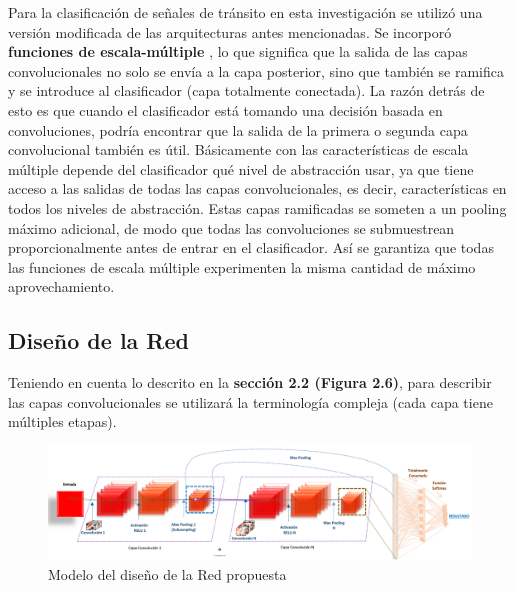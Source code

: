 	Para la clasificación de señales de tránsito en esta investigación se utilizó una versión modificada de las arquitecturas antes mencionadas. Se incorporó {\bf funciones de escala-múltiple} \citep{Multi_scale_feat}, lo que significa que la salida de las capas convolucionales no solo se envía a la capa posterior, sino que también se ramifica y se introduce al clasificador (capa totalmente conectada). La razón detrás de esto es que cuando el clasificador está tomando una decisión basada en convoluciones, podría encontrar que la salida de la primera o segunda capa convolucional también es útil. Básicamente con las características de escala múltiple depende del clasificador qué nivel de abstracción usar, ya que tiene acceso a las salidas de todas las capas convolucionales, es decir, características en todos los niveles de abstracción. Estas capas ramificadas se someten a un pooling máximo adicional, de modo que todas las convoluciones se submuestrean proporcionalmente antes de entrar en el clasificador. Así se garantiza que todas las funciones de escala múltiple experimenten la misma cantidad de máximo aprovechamiento.
	
	\subsection{Diseño de la Red}
	
	Teniendo en cuenta lo descrito en la {\bf sección 2.2 (Figura 2.6)}, para describir las capas convolucionales se utilizará la terminología compleja (cada capa tiene múltiples etapas).
	
		\begin{figure}[H]
		\includegraphics[width=1\textwidth]{images/desarrollo/networkArquitec/designNet}
		\begin{center}
		\caption{\small{Modelo del diseño de la Red propuesta}}
		{\small{\fontsize{10}{16.8}\selectfont {Fuente: Elaboración propia}}}
		\end{center}
		\vspace{-1.5em}
		\end{figure}

